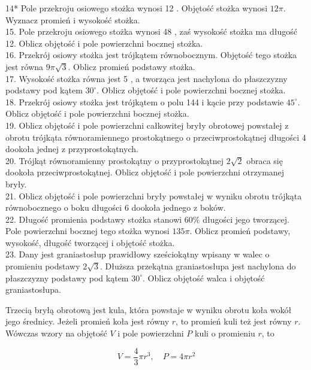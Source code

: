 \documentclass[10pt]{article}
\begin{document}
14* Pole przekroju osiowego stożka wynosi 12 . Objętość stożka wynosi \(12 \pi\). Wyznacz promień i wysokość stożka.\\
15. Pole przekroju osiowego stożka wynosi 48 , zaś wysokość stożka ma długość 12. Oblicz objętość i pole powierzchni bocznej stożka.\\
16. Przekrój osiowy stożka jest trójkątem równobocznym. Objętość tego stożka jest równa \(9 \pi \sqrt{3}\). Oblicz promień podstawy stożka.\\
17. Wysokość stożka równa jest 5 , a tworząca jest nachylona do płaszczyzny podstawy pod kątem \(30^{\circ}\). Oblicz objętość i pole powierzchni bocznej stożka.\\
18. Przekrój osiowy stożka jest trójkątem o polu 144 i kącie przy podstawie \(45^{\circ}\). Oblicz objętość i pole powierzchni bocznej stożka.\\
19. Oblicz objętość i pole powierzchni całkowitej bryły obrotowej powstałej z obrotu trójkąta równoramiennego prostokątnego o przeciwprostokątnej długości 4 dookoła jednej z przyprostokątnych.\\
20. Trójkąt równoramienny prostokątny o przyprostokątnej \(2 \sqrt{2}\) obraca się dookoła przeciwprostokątnej. Oblicz objętość i pole powierzchni otrzymanej bryły.\\
21. Oblicz objętość i pole powierzchni bryły powstałej w wyniku obrotu trójkąta równobocznego o boku długości 6 dookoła jednego z boków.\\
22. Długość promienia podstawy stożka stanowi \(60 \%\) długości jego tworzącej. Pole powierzchni bocznej tego stożka wynosi \(135 \pi\). Oblicz promień podstawy, wysokość, długość tworzącej i objętość stożka.\\
23. Dany jest graniastosłup prawidłowy sześciokątny wpisany w walec o promieniu podstawy \(2 \sqrt{3}\). Dłuższa przekątna graniastosłupa jest nachylona do płaszczyzny podstawy pod kątem \(30^{\circ}\). Oblicz objętość walca i objętość graniastosłupa.

Trzecią bryłą obrotową jest kula, która powstaje w wyniku obrotu koła wokół jego średnicy. Jeżeli promień koła jest równy \(r\), to promień kuli też jest równy \(r\). Wówczas wzory na objętość \(V\) i pole powierzchni \(P\) kuli o promieniu \(r\), to

\[
V=\frac{4}{3} \pi r^{3}, \quad P=4 \pi r^{2}
\]
\end{document}
